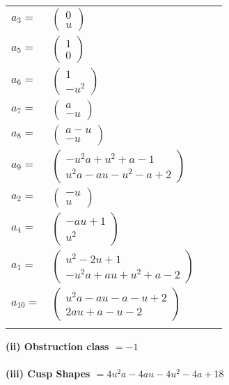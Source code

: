 \documentclass[1p]{elsarticle_modified}
\theoremstyle{definition}
\begin{document}
\begin{tabular}{m{7pt} m{180pt} m{7pt} m{180pt} }
\flushright $a_{3}=$&$\begin{pmatrix}0\\u\end{pmatrix}$ \\
\flushright $a_{5}=$&$\begin{pmatrix}1\\0\end{pmatrix}$ \\
\flushright $a_{6}=$&$\begin{pmatrix}1\\- u^2\end{pmatrix}$ \\
\flushright $a_{7}=$&$\begin{pmatrix}a\\- u\end{pmatrix}$ \\
\flushright $a_{8}=$&$\begin{pmatrix}a- u\\- u\end{pmatrix}$ \\
\flushright $a_{9}=$&$\begin{pmatrix}- u^2 a+u^2+a-1\\u^2 a- a u- u^2- a+2\end{pmatrix}$ \\
\flushright $a_{2}=$&$\begin{pmatrix}- u\\u\end{pmatrix}$ \\
\flushright $a_{4}=$&$\begin{pmatrix}- a u+1\\u^2\end{pmatrix}$ \\
\flushright $a_{1}=$&$\begin{pmatrix}u^2-2 u+1\\- u^2 a+a u+u^2+a-2\end{pmatrix}$ \\
\flushright $a_{10}=$&$\begin{pmatrix}u^2 a- a u- a- u+2\\2 a u+a- u-2\end{pmatrix}$\\&\end{tabular}
\flushleft \textbf{(ii) Obstruction class $= -1$}\\~\\
\flushleft \textbf{(iii) Cusp Shapes $= 4 u^2 a-4 a u-4 u^2-4 a+18$}\\~\\
\end{document}
